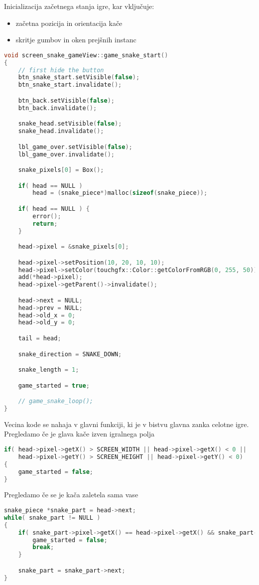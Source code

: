 \documentclass{article}
\begin{document}
\noindent
Inicializacija za\v{c}etnega stanja igre, kar vklju\v{c}uje:
\begin{itemize}
    \item za\v{c}etna pozicija in orientacija ka\v{c}e
    \item skritje gumbov in oken prej\v{s}nih instanc
\end{itemize}
\begin{lstlisting}[language=c++]
void screen_snake_gameView::game_snake_start()
{
	// first hide the button
	btn_snake_start.setVisible(false);
	btn_snake_start.invalidate();

	btn_back.setVisible(false);
	btn_back.invalidate();

	snake_head.setVisible(false);
	snake_head.invalidate();

	lbl_game_over.setVisible(false);
	lbl_game_over.invalidate();

	snake_pixels[0] = Box();

	if( head == NULL )
		head = (snake_piece*)malloc(sizeof(snake_piece));

	if( head == NULL ) {
		error();
		return;
	}

	head->pixel = &snake_pixels[0];

	head->pixel->setPosition(10, 20, 10, 10);
	head->pixel->setColor(touchgfx::Color::getColorFromRGB(0, 255, 50));
	add(*head->pixel);
	head->pixel->getParent()->invalidate();

	head->next = NULL;
	head->prev = NULL;
	head->old_x = 0;
	head->old_y = 0;

	tail = head;

	snake_direction = SNAKE_DOWN;

	snake_length = 1;

	game_started = true;

	// game_snake_loop();
}
\end{lstlisting}

\noindent
Vecina kode se nahaja v glavni funkciji, ki je v bistvu glavna
zanka celotne igre. \\

\noindent
Pregledamo \v{c}e je glava ka\v{c}e izven igralnega polja
\begin{lstlisting}[language=c++]
if( head->pixel->getX() > SCREEN_WIDTH || head->pixel->getX() < 0 ||
    head->pixel->getY() > SCREEN_HEIGHT || head->pixel->getY() < 0)
{
    game_started = false;
}
\end{lstlisting}

\noindent
Pregledamo \v{c}e se je ka\v{c}a zaletela sama vase
\begin{lstlisting}[language=c++]
snake_piece *snake_part = head->next;
while( snake_part != NULL )
{
    if( snake_part->pixel->getX() == head->pixel->getX() && snake_part->pixel->getY() == head->pixel->getY() ) {
        game_started = false;
        break;
    }

    snake_part = snake_part->next;
}
\end{lstlisting}
\end{document}
